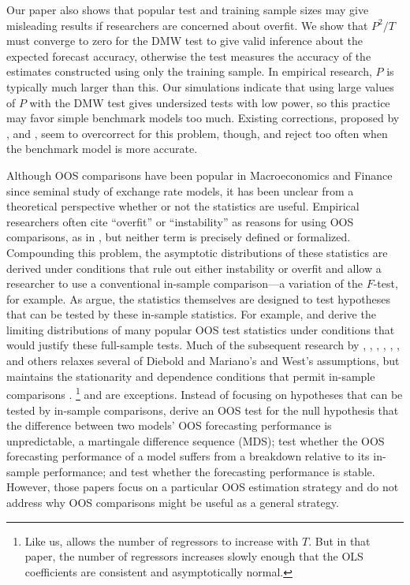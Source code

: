\documentclass[12pt]{article}
\begin{document}
Our paper also shows that popular test and training sample sizes may
give misleading results if researchers are concerned about overfit.
We show that $P^2/T$ must converge to zero for the DMW test to give
valid inference about the expected forecast accuracy, otherwise the
test measures the accuracy of the estimates constructed using only the
training sample.  In empirical research, $P$ is typically much larger
than this.  Our simulations indicate that using large values of $P$
with the DMW test gives undersized tests with low power, so this
practice may favor simple benchmark models too much.  Existing
corrections, proposed by \citet{ClM:01,ClM:05}, \citet{Mcc:07} and
\citet{ClW:06,ClW:07}, seem to overcorrect for this problem, though, and reject
too often when the benchmark model is more accurate.


Although OOS comparisons have been popular in Macroeconomics and
Finance since  seminal study of exchange rate models,
it has been unclear from a theoretical perspective whether or not the
statistics are useful.  Empirical researchers often cite ``overfit''
or ``instability'' as reasons for using OOS comparisons, as in
\citet{StW:03}, but neither term is precisely defined or formalized.
Compounding this problem, the asymptotic distributions of these
statistics are derived under conditions that rule out either
instability or overfit and allow a researcher to use a conventional
in-sample comparison---a variation of the $F$-test, for example.  As
\citet{InK:04} argue, the statistics themselves are designed to test
hypotheses that can be tested by these in-sample statistics.  For
example, \citet{DiM:95} and \citet{Wes:96} derive the limiting
distributions of many popular OOS test statistics under conditions
that would justify these full-sample tests.  Much
of the subsequent research by \citet{Mcc:00, Mcc:07}, \citet{CCS:01},
\citet{ClM:01,ClM:05}, \citet{CoS:02,CoS:04}, \citet{ClW:06,ClW:07},
\citet{Ana:07}, and others relaxes several of Diebold and Mariano's
and West's assumptions, but maintains the stationarity and dependence
conditions that permit in-sample comparisons \citep[see][for a
review of this literature]{Wes:06}.%
\footnote{Like us, \citet{Ana:07} allows the number of regressors to
  increase with $T$.  But in that paper, the number of regressors
  increases slowly enough that the OLS coefficients are consistent and
  asymptotically normal.} %
\citet{GiW:06} and
\citet{GiR:09, GiR:10} are exceptions.  Instead of focusing on
hypotheses that can be tested by in-sample comparisons, \citet{GiW:06}
derive an OOS test for the null hypothesis that the difference
between two models' OOS forecasting performance is unpredictable, a
martingale difference sequence (MDS); \citet{GiR:09} test whether the OOS
forecasting performance of a model suffers from a breakdown relative
to its in-sample performance; and \citet{GiR:10} test whether the
forecasting performance is stable. However, those papers focus on a
particular OOS estimation strategy and do not address why OOS
comparisons might be useful as a general strategy.
\end{document}
